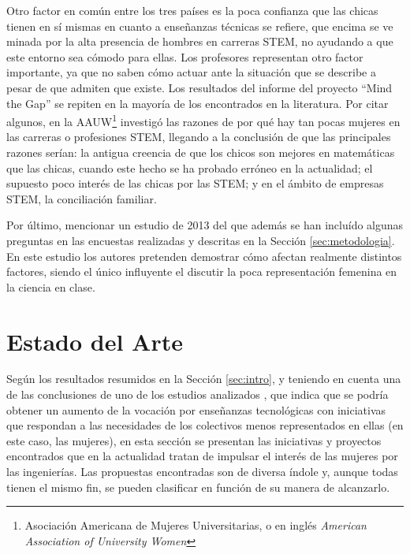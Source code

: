 \documentclass[runningheads,a4paper]{llncs}
\begin{document}
Otro factor en común entre los tres países es la poca confianza que las chicas tienen en sí mismas en cuanto a enseñanzas técnicas se refiere, que encima se ve minada por la alta presencia de hombres en carreras STEM, no ayudando a que este entorno sea cómodo para ellas. Los profesores representan otro factor importante, ya que no saben cómo actuar ante la situación que se describe a pesar de que admiten que existe.
Los resultados del informe del proyecto ``Mind the Gap'' se repiten en la mayoría de los encontrados en la literatura. Por citar algunos, en \cite{hill2010so} la AAUW\footnote{Asociación Americana de Mujeres Universitarias, o en inglés \textit{American Association of University Women}} investigó las razones de por qué hay tan pocas mujeres en las carreras o profesiones STEM, llegando a la conclusión de que las principales razones serían: la antigua creencia de que los chicos son mejores en matemáticas que las chicas, cuando este hecho se ha probado erróneo en la actualidad; el supuesto poco interés de las chicas por las STEM; y en el ámbito de empresas STEM, la conciliación familiar. 

Por último, mencionar un estudio de 2013 \cite{hazari2013factors} del que además se han incluído algunas preguntas en las encuestas realizadas y descritas en la Sección \ref{sec:metodologia}. En este estudio los autores pretenden demostrar cómo afectan realmente distintos factores, siendo el único influyente el discutir la poca representación femenina en la ciencia en clase.

\section{Estado del Arte}
\label{sec:EdA}

Según los resultados resumidos en la Sección \ref{sec:intro}, y teniendo en cuenta una de las conclusiones de uno de los estudios analizados \cite{everis2012}, que indica que se podría obtener un aumento de la vocación por enseñanzas tecnológicas con iniciativas que respondan a las necesidades de los colectivos menos representados en ellas (en este caso, las mujeres), en esta sección se presentan las iniciativas y proyectos encontrados que en la actualidad tratan de impulsar el interés de las mujeres por las ingenierías. Las propuestas encontradas son de diversa índole y, aunque todas tienen el mismo fin, se pueden clasificar en función de su manera de alcanzarlo.
\end{document}
